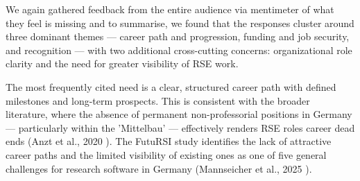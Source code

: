\documentclass{eceasst}
\begin{document}
%
%

We again gathered feedback from the entire audience via mentimeter of what they feel is missing
and to summarise, we found that the responses cluster around three dominant themes — career path and progression, funding and job security, and recognition — with two additional cross-cutting concerns: organizational role clarity and the need for greater visibility of RSE work.

The most frequently cited need is a clear, structured career path with defined milestones and long-term prospects. This is consistent with the broader literature, where the absence of permanent non-professorial positions in Germany — particularly within the 'Mittelbau' — effectively renders RSE roles career dead ends (Anzt et al., 2020 \cite{Anzt:2020}). The FutuRSI study identifies the lack of attractive career paths and the limited visibility of existing ones as one of five general challenges for research software in Germany (Mannseicher et al., 2025 \cite{Mannseicher:2025a}).
\end{document}
